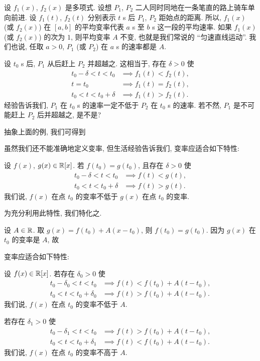 \begin{example}
    设 $f_1 (x)$, $f_2 (x)$ 是多项式. 设想 $P_1$, $P_2$ 二人同时同地在一条笔直的路上骑车单向前进. 设 $f_1 (t)$, $f_2 (t)$ 分别表示 $t$ s 后 $P_1$, $P_2$ 距始点的距离. 所以, $f_1 (x)$ (或 $f_2 (x)$) 在 $[a, b]$ 的平均变率代表 $a$ s 至 $b$ s 这一段的平均速率. 如果 $f_1 (x)$ (或 $f_2 (x)$) 的次为 $1$, 则平均变率 $A$ 不变, 也就是我们常说的 ``匀速直线运动''. 我们也说, 任取 $a > 0$, $P_1$ (或 $P_2$) 在 $a$ s 的速率都是 $A$.

    设 $t_0$ s 后, $P_1$ 从后赶上 $P_2$ 并超越之. 这相当于, 存在 $\delta > 0$ 使
    \begin{align*}
        t_0 - \delta < t < t_0 & \implies f_1 (t) < f_2 (t), \\
        t = t_0                & \implies f_1 (t) = f_2 (t), \\
        t_0 < t < t_0 + \delta & \implies f_1 (t) > f_2 (t).
    \end{align*}
    经验告诉我们, $P_1$ 在 $t_0$ s 的速率一定不低于 $P_2$ 在 $t_0$ s 的速率. 若不然, $P_1$ 是不可能赶上 $P_2$ 后并超越之, 是不是?
\end{example}

抽象上面的例, 我们可得到

\begin{proposition}
    虽然我们还不能准确地定义变率, 但生活经验告诉我们, 变率应适合如下特性:

    设 $f (x)$, $g (x) \in \mathbb{R}[x]$. 若 $f (t_0) = g (t_0)$, 且存在 $\delta > 0$ 使
    \begin{align*}
        t_0 - \delta < t < t_0 & \implies f (t) < g (t), \\
        t_0 < t < t_0 + \delta & \implies f (t) > g (t).
    \end{align*}
    我们说, $f (x)$ 在点 $t_0$ 的变率不低于 $g (x)$ 在点 $t_0$ 的变率.
\end{proposition}

为充分利用此特性, 我们特化之.

设 $A \in \mathbb{R}$. 取 $g(x) = f(t_0) + A (x - t_0)$, 则 $f(t_0) = g(t_0)$. 因为 $g(x)$ 在 $t_0$ 的变率是 $A$, 故

\begin{proposition}
    变率应适合如下特性:

    设 $f (x) \in \mathbb{R}[x]$. 若存在 $\delta_0 > 0$ 使
    \begin{align*}
        t_0 - \delta_0 < t < t_0 & \implies f (t) < f(t_0) + A (t - t_0), \\
        t_0 < t < t_0 + \delta_0 & \implies f (t) > f(t_0) + A (t - t_0).
    \end{align*}
    我们说, $f (x)$ 在点 $t_0$ 的变率不低于 $A$.

    若存在 $\delta_1 > 0$ 使
    \begin{align*}
        t_0 - \delta_1 < t < t_0 & \implies f (t) > f(t_0) + A (t - t_0), \\
        t_0 < t < t_0 + \delta_1 & \implies f (t) < f(t_0) + A (t - t_0).
    \end{align*}
    我们说, $f (x)$ 在点 $t_0$ 的变率不高于 $A$.
\end{proposition}

